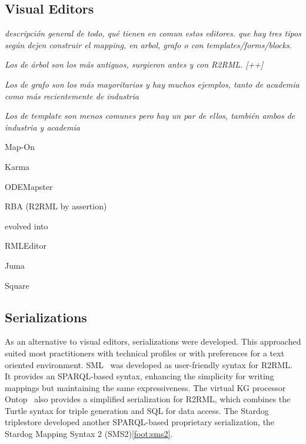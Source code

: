 \subsection{Visual Editors}

\textit{descripción general de todo, qué tienen en comun estos editores. que hay tres tipos según dejen construir el mapping, en arbol, grafo o con templates/forms/blocks. }

\textit{Los de árbol son los más antiguos, surgieron antes y con R2RML. [++]}

\textit{Los de grafo son los más mayoritarios y hay muchos ejemplos, tanto de academia como más recientemente de industria}

\textit{Los de template son menos comunes pero hay un par de ellos, también ambos de industria y academia}

Map-On~\parencite{sicilia2017map}

Karma~\parencite{gupta2012karma}

ODEMapster~\parencite{barrasa2006odemapster}

RBA (R2RML by assertion)~\parencite{neto2013rba}

\cite{sengupta2013editing} evolved into \cite{pinkel2014best}

\cite{lembo2014visualization}

RMLEditor~\parencite{heyvaert2016rmleditor}

Juma~\parencite{crotti2017juma}

Square~\parencite{blinkiewicz2016square}




\subsection{Serializations}

As an alternative to visual editors, serializations were developed. This approached suited most practitioners with technical profiles or with preferences for a text oriented environment. 
SML~\parencite{Stadler2015sml} was developed as user-friendly syntax for R2RML. It provides an SPARQL-based syntax, enhancing the simplicity for writing mappings but maintaining the same expressiveness. 
The virtual KG processor Ontop~\parencite{calvanese2017ontop} also provides a simplified serialization for R2RML, which combines the Turtle syntax for triple generation and SQL for data access. 
The Stardog triplestore developed another SPARQL-based proprietary serialization, the Stardog Mapping Syntax 2 (SMS2)\cref{foot:sms2}. 

